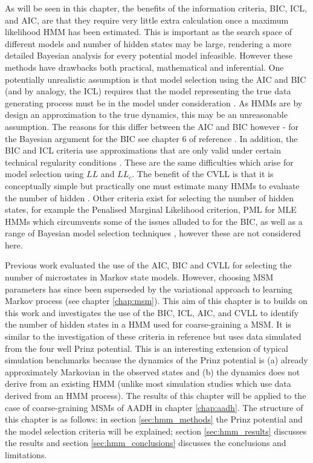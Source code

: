 As will be seen in this chapter, the benefits of the information criteria, BIC, ICL, and AIC, are that they require  very little extra calculation once a maximum likelihood HMM has been estimated. This is important as the search space of different models and number of hidden states may be large, rendering a more detailed Bayesian analysis for every potential model infeasible. However these methods have drawbacks both practical, mathematical and inferential. One potentially unrealistic assumption is that model selection using the AIC and BIC (and by analogy, the ICL) requires that the model representing the true data generating process must be in the model under consideration \cite{ripley_1996}. As HMMs are by design an approximation to the true dynamics, this may be an unreasonable assumption. The reasons for this differ between the AIC and BIC however - for the Bayesian argument for the BIC see chapter 6 of reference \cite{bernardo2007bayesian}. In addition, the BIC and ICL criteria use approximations that are only valid under certain technical regularity conditions \cite{mclachlanFiniteMixtureModels2000}. These are the same difficulties which arise for  model selection using $LL$ and $LL_{c}$.  The benefit of the CVLL  is that it is conceptually simple but practically  one must estimate many HMMs to evaluate the number of hidden \cite{celeuxSelectingHiddenMarkov2008}. Other criteria exist for selecting the number of hidden states, for example the Penalised Marginal Likelihood criterion, PML \cite{gassiatLikelihoodRatioInequalities2002} for MLE HMMs which circumvents some of the issues alluded to for the BIC, as well as a range of Bayesian model selection techniques \cite{gelmanBayesianDataAnalysis2014,bernardo2007bayesian}, however these are not considered here. 


Previous work \cite{mcgibbonStatisticalModelSelection2014a} evaluated the use of the AIC, BIC and CVLL for selecting the number of microstates in Markov state models. However, choosing MSM parameters has since been superseded by the variational approach to learning Markov process (see chapter \ref{chap:msm}). This aim of this chapter is to builds on this work and investigates the use of the BIC, ICL, AIC, and CVLL to identify the number of hidden states in a HMM used for coarse-graining a MSM. It is similar to the investigation of these criteria in reference \cite{celeuxSelectingHiddenMarkov2008} but uses data simulated from the four well Prinz potential. This is an interesting extension of typical simulation benchmarks because the dynamics of the Prinz potential is (a) already approximately Markovian in the observed states \cite{prinzMarkovModelsMolecular2011} and (b) the dynamics does not derive from an existing HMM (unlike most simulation studies which use data derived from an HMM process). The results of this chapter will be applied to the case of coarse-graining MSMs of AADH in chapter \ref{chap:aadh}.  The structure of this chapter is as follows: in section \ref{sec:hmm_methods} the Prinz potential and the model selection criteria will be explained; section \ref{sec:hmm_results} discusses the results and section \ref{sec:hmm_conclusions} discusses the conclusions and limitations.


